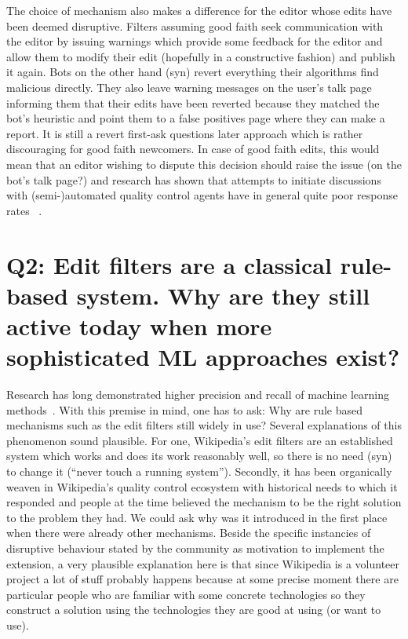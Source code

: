 The choice of mechanism also makes a difference for the editor whose edits have been deemed disruptive.
Filters assuming good faith seek communication with the editor by issuing warnings which provide some feedback for the editor and allow them to modify their edit (hopefully in a constructive fashion) and publish it again.
Bots on the other hand (syn) revert everything their algorithms find malicious directly.
They also leave warning messages on the user's talk page informing them that their edits have been reverted because they matched the bot's heuristic and point them to a false positives page where they can make a report.
It is still a revert first-ask questions later approach which is rather discouraging for good faith newcomers.
In case of good faith edits, this would mean that an editor wishing to dispute this decision should raise the issue (on the bot's talk page?) and research has shown that attempts to initiate discussions with (semi-)automated quality control agents have in general quite poor response rates ~\cite{HalGeiMorRied2013}.


\section{Q2: Edit filters are a classical rule-based system. Why are they still active today when more sophisticated ML approaches exist?}

Research has long demonstrated higher precision and recall of machine learning methods~\cite{PotSteGer2008}. %
With this premise in mind, one has to ask:
Why are rule based mechanisms such as the edit filters still widely in use?
Several explanations of this phenomenon sound plausible.
For one, Wikipedia's edit filters are an established system which works and does its work reasonably well, so there is no need (syn) to change it  (``never touch a running system'').
Secondly, it has been organically weaven in Wikipedia's quality control ecosystem with historical needs to which it responded and people at the time believed the mechanism to be the right solution to the problem they had.
We could ask why was it introduced in the first place when there were already other mechanisms.
Beside the specific instancies of disruptive behaviour stated by the community as motivation to implement the extension,
a very plausible explanation here is that since Wikipedia is a volunteer project a lot of stuff probably happens because at some precise moment there are particular people who are familiar with some concrete technologies so they construct a solution using the technologies they are good at using (or want to use).

